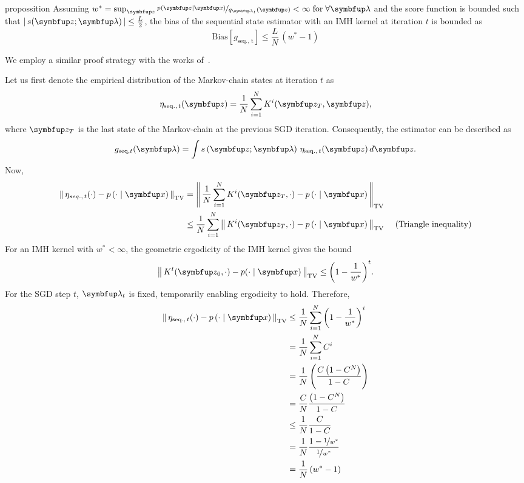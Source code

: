 
\begin{theoremEnd}{propossition}\label{thm:bias_seq}
  Assuming \(w^* = \sup_{\vz} \nicefrac{p\left(\vz\mid\vx\right)}{q_{\vlambda_{t}}\left(\vz\right)} < \infty\; \text{for} \; \forall \vlambda \) and the score function is bounded such that \(\left|\,s(\vz; \vlambda)\,\right| \leq \frac{L}{2}\), the bias of the sequential state estimator with an IMH kernel at iteration \(t\) is bounded as
  {\small
  \[
    \mathrm{Bias}\left[ g_{\mathrm{seq.,\, t}} \right] \leq \frac{L}{N} \, (w^* - 1)
  \]
  }
\end{theoremEnd}
%
\begin{proofEnd}
  We employ a similar proof strategy with the works of~\citet[Theorem 4]{jiang_mcmc_2021}.

  Let us first denote the empirical distribution of the Markov-chain states at iteration \(t\) as
  \begin{align}
    \eta_{\mathrm{seq.},\, t}(\vz) = \frac{1}{N} \sum_{i=1}^N K^{i}(\vz_T, \vz),
  \end{align}
  where \(\vz_{T}\) is the last state of the Markov-chain at the previous SGD iteration.
  Consequently, the estimator can be described as
  \begin{align}
      g_{\mathrm{seq}, t}(\vlambda) = \int s\left(\vz; \vlambda\right) \, \eta_{\mathrm{seq.},\, t}(\vz) \, d\vz.
  \end{align}
  Now,
  \begin{align}
    \DTV{ \eta_{seq.,\, t}(\cdot) }{p\left(\cdot\mid\vx\right)}
    &= \DTV{\frac{1}{N} \sum_{i=1}^N K^{i}(\vz_T, \cdot)}{p\left(\cdot\mid\vx\right)} \\
    &\leq \frac{1}{N} \sum_{i=1}^N  \DTV{K^{i}(\vz_T, \cdot)}{p\left(\cdot\mid\vx\right)} &\text{ (Triangle inequality)}
  \end{align}
 For an IMH kernel with \(w^* < \infty\), the geometric ergodicity of the IMH kernel \citep[Theorem 2.1]{10.2307/2242610} gives the bound
 \begin{align}
   \DTV{K^t(\vz_{0}, \cdot)}{p(\cdot\mid\vx)} \leq {\left(1 - \frac{1}{w^*}\right)}^t.
 \end{align}
 For the SGD step \(t\), \(\vlambda_{t}\) is fixed, temporarily enabling ergodicity to hold.
 Therefore, 
  \begin{align}
    \DTV{ \eta_{\mathrm{seq.},\, t}(\cdot) }{p\left(\cdot\mid\vx\right)}
    &\leq \frac{1}{N} \sum_{i=1}^N {\left( 1 - \frac{1}{w^*} \right)}^i \\
    &=    \frac{1}{N} \sum_{i=1}^N C^i \\
    &=    \frac{1}{N} \left(\frac{ C \left(1 - C^{N}\right)}{1 - C}\right) \\
    &=    \frac{C}{N} \frac{ \left(1 - C^{N}\right) }{1 - C} \\
    &\leq \frac{1}{N} \frac{ C }{1 - C} \\
    &=    \frac{1}{N} \frac{ 1 - \nicefrac{1}{w^*} }{ \nicefrac{1}{w^*} } \\
    &=    \frac{1}{N} \left( w^* - 1 \right)
  \end{align}


\end{proofEnd}
